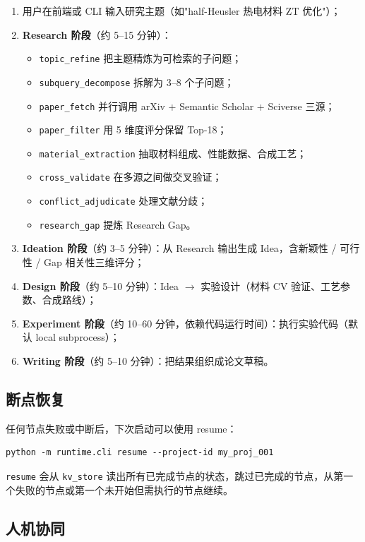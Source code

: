 \documentclass[11pt,a4paper]{article}
\begin{document}
\begin{enumerate}[leftmargin=2em]
\item 用户在前端或 CLI 输入研究主题（如"half-Heusler 热电材料 ZT 优化"）；
\item \textbf{Research 阶段}（约 5--15 分钟）：
  \begin{itemize}
  \item \texttt{topic\_refine} 把主题精炼为可检索的子问题；
  \item \texttt{subquery\_decompose} 拆解为 3--8 个子问题；
  \item \texttt{paper\_fetch} 并行调用 arXiv + Semantic Scholar + Sciverse 三源；
  \item \texttt{paper\_filter} 用 5 维度评分保留 Top-18；
  \item \texttt{material\_extraction} 抽取材料组成、性能数据、合成工艺；
  \item \texttt{cross\_validate} 在多源之间做交叉验证；
  \item \texttt{conflict\_adjudicate} 处理文献分歧；
  \item \texttt{research\_gap} 提炼 Research Gap。
  \end{itemize}
\item \textbf{Ideation 阶段}（约 3--5 分钟）：从 Research 输出生成 Idea，含新颖性 / 可行性 / Gap 相关性三维评分；
\item \textbf{Design 阶段}（约 5--10 分钟）：Idea $\to$ 实验设计（材料 CV 验证、工艺参数、合成路线）；
\item \textbf{Experiment 阶段}（约 10--60 分钟，依赖代码运行时间）：执行实验代码（默认 local subprocess）；
\item \textbf{Writing 阶段}（约 5--10 分钟）：把结果组织成论文草稿。
\end{enumerate}

\subsection{断点恢复}

任何节点失败或中断后，下次启动可以使用 resume：

\begin{verbatim}
python -m runtime.cli resume --project-id my_proj_001
\end{verbatim}

\texttt{resume} 会从 \texttt{kv\_store} 读出所有已完成节点的状态，跳过已完成的节点，从第一个失败的节点或第一个未开始但需执行的节点继续。

\subsection{人机协同}
\end{document}
